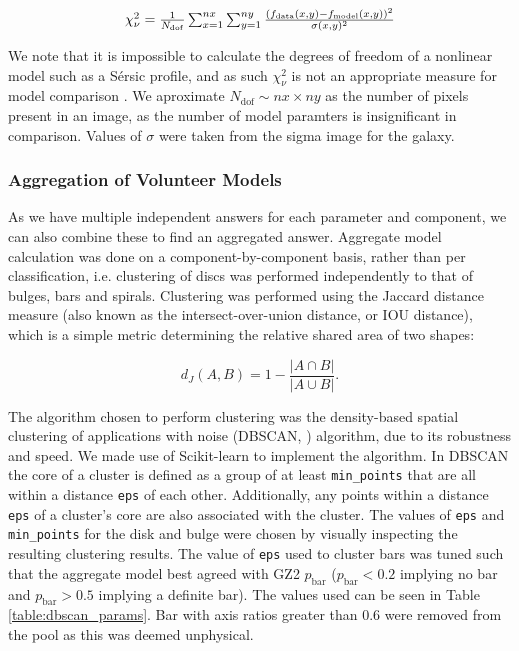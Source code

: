 \documentclass[../main.tex]{subfiles}
\begin{document}
\begin{equation}
  \label{eqn:chisq}
  $$\chi_\nu^2 =\frac{1}{N_\mathrm{dof}}\sum_{x=1}^{nx}\sum_{y=1}^{ny}\frac{\left(f_\mathrm{data}(x, y) - f_\mathrm{model}(x, y)\right)^2}{\sigma(x, y)^2}$$
\end{equation}

We note that it is impossible to calculate the degrees of freedom of a nonlinear model such as a S\'ersic profile, and as such $\chi_\nu^2$ is not an appropriate measure for model comparison \citep{2010arXiv1012.3754A}. We aproximate $N_\mathrm{dof} \sim nx \times ny$ as the number of pixels present in an image, as the number of model paramters is insignificant in comparison. Values of $\sigma$ were taken from the sigma image for the galaxy.


\subsubsection{Aggregation of Volunteer Models}
\label{sec:aggregation_of_volunteer_models}

As we have multiple independent answers for each parameter and component, we can also combine these to find an aggregated answer. Aggregate model calculation was done on a component-by-component basis, rather than per classification, i.e. clustering of discs was performed independently to that of bulges, bars and spirals. Clustering was performed using the Jaccard distance measure (also known as the intersect-over-union distance, or IOU distance), which is a simple metric determining the relative shared area of two shapes:

\begin{equation}
d_J(A, B) = 1 - \frac{|A \cap B|}{|A \cup B|}.
\end{equation}

The algorithm chosen to perform clustering was the density-based spatial clustering of applications with noise (DBSCAN, \citealt{dbscan}) algorithm, due to its robustness and speed. We made use of Scikit-learn \citep{scikit-learn} to implement the algorithm. In DBSCAN the core of a cluster is defined as a group of at least \texttt{min\_points} that are all within a distance \texttt{eps} of each other. Additionally, any points within a distance \texttt{eps} of a cluster's core are also associated with the cluster.
The values of \texttt{eps} and \texttt{min\_points} for the disk and bulge were chosen by visually inspecting the resulting clustering results. The value of \texttt{eps} used to cluster bars was tuned such that the aggregate model best agreed with GZ2 $p_\mathrm{bar}$ ($p_\mathrm{bar} < 0.2$ implying no bar and $p_\mathrm{bar} > 0.5$ implying a definite bar). The values used can be seen in Table \ref{table:dbscan_params}. Bar with axis ratios greater than 0.6 were removed from the pool as this was deemed unphysical.
\end{document}
